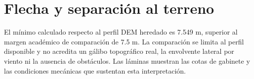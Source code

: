 \section{Flecha y separación al terreno}
El mínimo calculado respecto al perfil DEM heredado es 7.549 m, superior al margen académico de comparación de 7.5 m. La comparación se limita al perfil disponible y no acredita un gálibo topográfico real, la envolvente lateral por viento ni la ausencia de obstáculos. Las láminas muestran las cotas de gabinete y las condiciones mecánicas que sustentan esta interpretación.
